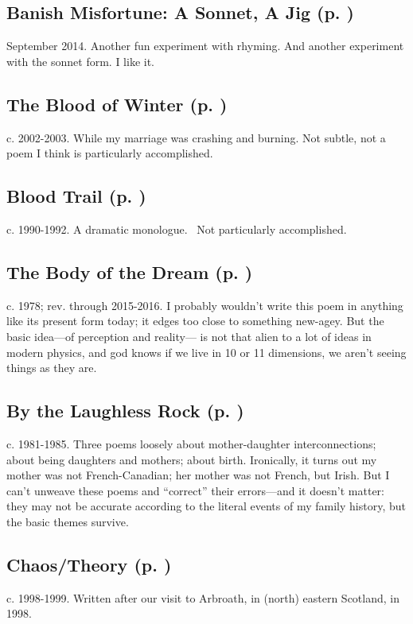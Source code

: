 \subsection*{Banish Misfortune: A Sonnet, A Jig (p. \pageref{ch:banish_misfortune})}
September 2014. Another fun experiment with rhyming. And
another experiment with the sonnet form. I like
it.

\subsection*{The Blood of Winter (p. \pageref{ch:the_blood_of_winter})}
c. 2002-2003. While my marriage was crashing and
burning. Not subtle, not a poem I think is particularly
accomplished.

\subsection*{Blood Trail (p. \pageref{ch:blood_trail})}
c. 1990-1992. A dramatic monologue.~ Not particularly
accomplished.

\subsection*{The Body of the Dream (p. \pageref{ch:the_body_of_the_dream})}
c. 1978; rev. through 2015-2016. I probably wouldn't
write this poem in anything like its present form today; it edges too
close to something new-agey. But the basic idea---of perception and
reality--- is not that alien to a lot of ideas in modern physics, and
god knows if we live in 10 or 11 dimensions, we aren't seeing things as
they are.

\subsection*{By the Laughless Rock (p. \pageref{ch:by_the_laughless_rock})}
c. 1981-1985. Three poems loosely about mother-daughter
interconnections; about being daughters and mothers; about birth.
Ironically, it turns out my mother was not French-Canadian; her mother
was not French, but Irish. But I can't unweave these poems and ``correct''
their errors---and it doesn't matter: they may not be accurate
according to the literal events of my family history, but the basic
themes survive.

\subsection*{Chaos/Theory (p. \pageref{ch:chaos_theory})}
c. 1998-1999. Written after our visit to Arbroath, in
(north) eastern Scotland, in 1998.


